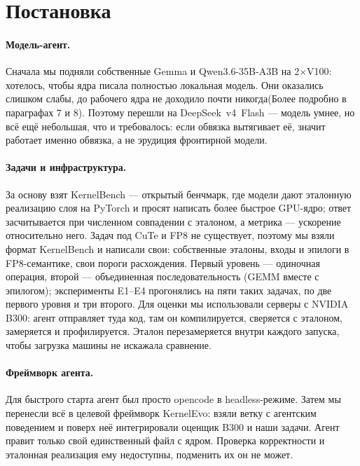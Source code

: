 \documentclass[10pt,a4paper]{article}
\begin{document}
\section{Постановка}

\paragraph{Модель-агент.} Сначала мы подняли собственные Gemma и Qwen3.6-35B-A3B на
2$\times$V100: хотелось, чтобы ядра писала полностью локальная модель. Они оказались слишком
слабы, до рабочего ядра не доходило почти никогда(Более подробно в параграфах 7 и 8). Поэтому перешли на DeepSeek~v4~Flash ---
модель умнее, но всё ещё небольшая, что и требовалось: если обвязка вытягивает её, значит
работает именно обвязка, а не эрудиция фронтирной модели.

\paragraph{Задачи и инфраструктура.} За основу взят KernelBench --- открытый бенчмарк, где
модели дают эталонную реализацию слоя на PyTorch и просят написать более быстрое GPU-ядро;
ответ засчитывается при численном совпадении с эталоном, а метрика --- ускорение
относительно него. Задач под CuTe и FP8 не существует, поэтому мы взяли формат KernelBench и
написали свои: собственные эталоны, входы и эпилоги в FP8-семантике, свои пороги
расхождения. Первый уровень --- одиночная операция, второй --- объединенная последовательность
(GEMM вместе с эпилогом); эксперименты E1--E4 прогонялись на пяти таких задачах, по две
первого уровня и три второго. Для оценки мы использовали серверы с NVIDIA B300: агент отправляет
туда код, там он компилируется, сверяется с эталоном, замеряется и профилируется. Эталон
перезамеряется внутри каждого запуска, чтобы загрузка машины не искажала сравнение.

\paragraph{Фреймворк агента.} Для быстрого старта агент был просто opencode в
headless-режиме. Затем мы перенесли всё в целевой фреймворк KernelEvo: взяли ветку с
агентским поведением и поверх неё интегрировали оценщик B300 и наши задачи. Агент правит
только свой единственный файл с ядром. Проверка корректности и эталонная реализация ему
недоступны, подменить их он не может.
\end{document}
